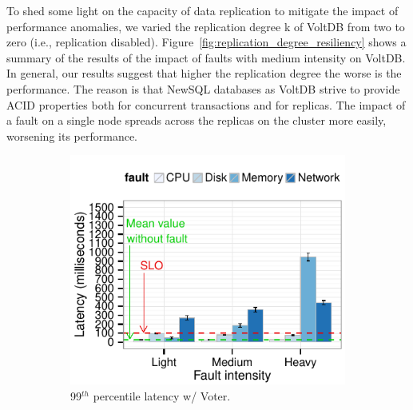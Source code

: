 To shed some light on the capacity of data replication to mitigate the impact of performance anomalies, we varied the replication degree k of VoltDB from two to zero (i.e., replication disabled). Figure~\ref{fig:replication_degree_resiliency} shows a summary of the results of the impact of faults with medium intensity on VoltDB. In general, our results suggest that higher the replication degree the worse is the performance. The reason is that NewSQL databases as VoltDB strive to provide ACID properties both for concurrent transactions and for replicas. The impact of a fault on a single node spreads across the replicas on the cluster more easily, worsening its performance.

\begin{figure}
        \centering
        \begin{subfigure}[b]{0.48\textwidth}
               \includegraphics[width=1\textwidth]{inputs/img/fault_impact_this_latency_99th_voltdb_voter}
                \caption{99$^{th}$ percentile latency w/ Voter.}
                \label{fig:fault_impact_this_latency_99th_voltdb_voter}
        \end{subfigure}
        ~ %
        \begin{subfigure}[b]{0.48\textwidth}

\end{subfigure}
\end{figure}
